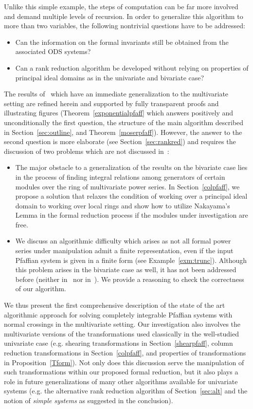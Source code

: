 \documentclass[final,1p,times,number,amsthm]{elsart}
\begin{document}
Unlike this simple example, the steps of computation can be far more involved
and demand multiple levels of recursion. In order to generalize this algorithm
to more than two variables, the following nontrivial questions have to be
addressed:

\begin{itemize}
\item Can the information on the formal invariants still be obtained from the
  associated ODS systems?
\item Can a rank reduction algorithm be developed without relying on properties
  of principal ideal domains as in the univariate and bivariate case?
\end{itemize}
The results of~\cite{key101} which have an immediate generalization to the
multivariate setting are refined herein and supported by fully transparent
proofs and illustrating figures (Theorem~\ref{exponentialpfaff} which answers
positively and unconditionally the first question, the structure of the main
algorithm described in Section~\ref{sec:outline}, and
Theorem~\ref{moserpfaff}). However, the answer to the second question is more
elaborate (see Section~\ref{sec:rankred}) and requires the discussion of two
problems which are not discussed in~\cite{key101}:
\begin{itemize}
\item The major obstacle to a generalization of the results on the
  bivariate case lies in the process of finding integral relations among
  generators of certain modules over the ring of multivariate power series. In
  Section~\ref{colpfaff}, we propose a solution that relaxes the condition
  of working over a principal ideal domain to working over local rings and show
  how to utilize Nakayama’s Lemma in the formal reduction process if the modules
  under investigation are free.
\item We discuss an algorithmic difficulty which arises as not all formal power
  series under manipulation admit a finite representation, even if the input
  Pfaffian system is given in a finite form (see
  Example~\ref{exm:trunc}). Although this problem arises in the bivariate case
  as well, it has not been addressed before (neither in~\cite{key101} nor
  in~\cite{key5,key73}). We provide a reasoning to check the correctness of our
  algorithm.
\end{itemize} 
We thus present the first comprehensive description of the state of the art
algorithmic approach for solving completely integrable Pfaffian systems with
normal crossings in the multivariate setting. Our investigation also involves
the multivariate versions of the transformations used classically in the
well-studied univariate case (e.g. shearing transformations in
Section~\ref{shearpfaff}, column reduction transformations in
Section~\ref{colpfaff}, and properties of transformations in
Proposition~\ref{Tform}). Not only does this discussion serve the manipulation
of such transformations within our proposed formal reduction, but it also plays
a role in future generalizations of many other algorithms available for
univariate systems (e.g. the alternative rank reduction algorithm of
Section~\ref{sec:alt} and the notion of \emph{simple systems} as suggested in
the conclusion).
\end{document}
